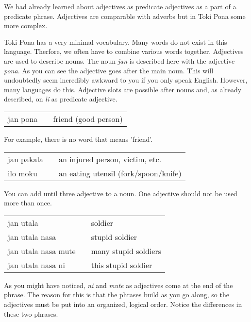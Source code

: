 We had already learned about adjectives as predicate adjectives as a part of a predicate phrase. 
Adjectives are comparable with adverbs but in Toki Pona some more complex.

Toki Pona has a very minimal vocabulary. 
Many words do not exist in this language. 
Therfore, we often have to combine various words together.
Adjectives are used to describe nouns. 
The noun \textit{jan} is described here with the adjective \textit{pona}.
As you can see the adjective goes after the main noun. 
This will undoubtedly seem incredibly awkward to you if you only speak English. 
However, many languages do this. 
Adjective slots are possible after nouns and, as already described, on \textit{li} as predicate adjective.

\begin{supertabular}{p{5,5cm}|ll}
jan pona && friend (good person) \\
\end{supertabular} 

For example, there is no word that means 'friend'. 

\begin{supertabular}{p{5,5cm}|ll}
jan pakala && an injured person, victim, etc. \\
ilo moku && an eating utensil (fork/spoon/knife) \\
\end{supertabular} 

You can add until three adjective to a noun. 
One adjective should not be used more than once.

\begin{supertabular}{p{5,5cm}|ll}
jan utala && soldier  \\
jan utala nasa && stupid soldier  \\
jan utala nasa mute && many stupid soldiers  \\
jan utala nasa ni && this stupid soldier  \\
\end{supertabular} 

As you might have noticed, \textit{ni} and \textit{mute} as adjectives come at the end of the phrase. 
The reason for this is that the phrases build as you go along, so the adjectives must be put into an organized, logical order. 
Notice the differences in these two phrases.

